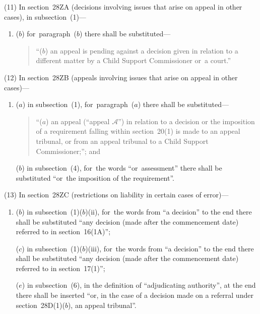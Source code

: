 \documentclass[12pt,a4paper]{article}
\begin{document}
(11) In section~28ZA (decisions involving issues that arise on appeal in other cases), in subsection~(1)—
\begin{enumerate}\item[]

($b$) for~paragraph~($b$)  there shall be substituted—

\begin{quotation}
“($b$) an appeal is pending against a decision given in relation to a different matter by a Child Support Commissioner or~a court.”
\end{quotation}
\end{enumerate}

(12) In section~28ZB (appeals involving issues that arise on appeal in other cases)—
\begin{enumerate}\item[]
($a$) in subsection~(1), for~paragraph~($a$)  there shall be substituted—
\begin{quotation}
“($a$) an appeal (“appeal $\mathcal{A}$”) in relation to a decision or the imposition of a requirement falling within section~20(1)  is made to an appeal tribunal, or from an appeal tribunal to a Child Support Commissioner;”; and
\end{quotation}

($b$) in subsection~(4), for~the words “or~assessment” there shall be substituted “or~the imposition of the requirement”.
\end{enumerate}

(13) In section~28ZC (restrictions on liability in certain cases of error)—
\begin{enumerate}\item[]

($b$) in subsection~(1)($b$)(ii), for~the words from “a decision” to the end there shall be substituted “any decision (made after the commencement date) referred to in section~16(1A)”;

($c$) in subsection~(1)($b$)(iii), for~the words from “a decision” to the end there shall be substituted “any decision (made after the commencement date) referred to in section~17(1)”;


($e$) in subsection~(6), in the definition of “adjudicating authority”, at the end there shall be inserted “or, in the case of a decision made on a referral under section~28D(1)($b$), an appeal tribunal”.
\end{enumerate}
\end{document}
